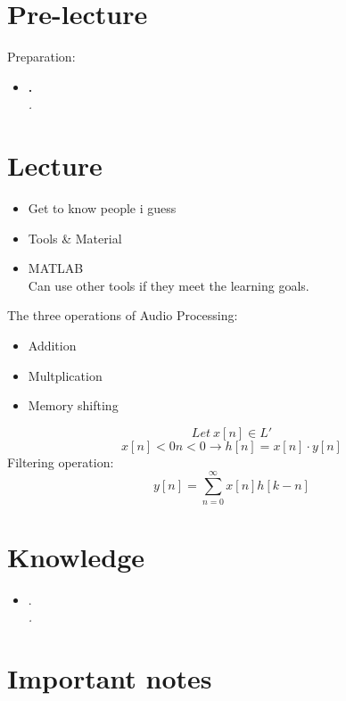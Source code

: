 \documentclass{article}
\title{}
\author{Jannick Drews}
\date{\today}
\begin{document}
\maketitle
\newpage

\section{Pre-lecture}
Preparation: \\
\begin{itemize}
  \item \textbf{.}\\
    \textit{.}
\end{itemize}

\section{Lecture}
\begin{itemize}
    \item Get to know people i guess
    \item Tools \& Material
    \item MATLAB\\
        Can use other tools if they meet the learning goals.
\end{itemize}
The three operations of Audio Processing:
\begin{itemize}
    \item Addition
    \item Multplication
    \item Memory shifting
\end{itemize}
$$Let \ x[n]\in L'$$
$$ x[n] < 0n < 0 \rightarrow h[n] = x[n] \cdot y[n] $$
Filtering operation: $$ y[n] = \sum_{n=0}^{\infty} x[n]h[k-n] $$


\section{Knowledge}
\begin{itemize}
  \item .\\
    \textit{.}
\end{itemize}

\section{Important notes}
\end{document}
